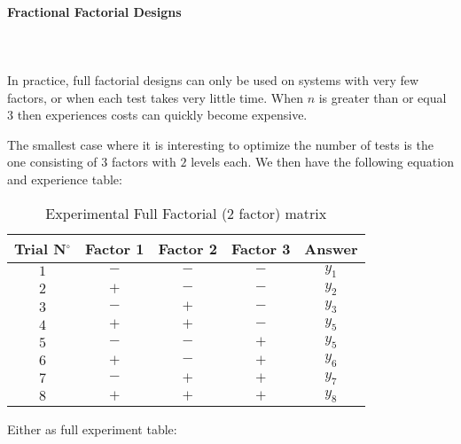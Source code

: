 	\pagebreak
	\paragraph{Fractional Factorial Designs}\mbox{}\\\\
	In practice, full factorial designs can only be used on systems with very few factors, or when each test takes very little time. When $n$ is greater than or equal $3$ then experiences costs can quickly become expensive.

	The smallest case where it is interesting to optimize the number of tests is the one consisting of $3$ factors with $2$ levels each. We then have the following equation and experience table:
	
	\begin{table}[H]\centering
	\begin{center}
			\begin{tabular}{|c|c|c|c|c|}
				\hline
				\multicolumn{1}{c}{\cellcolor{black!30}\textbf{Trial N${}^\circ$}} & 
  \multicolumn{1}{c}{\cellcolor{black!30}\textbf{Factor 1}} & 
  \multicolumn{1}{c}{\cellcolor{black!30}\textbf{Factor 2}} & 
  \multicolumn{1}{c}{\cellcolor{black!30}\textbf{Factor 3}} & 
  \multicolumn{1}{c}{\cellcolor{black!30}\textbf{Answer}} \\ \hline
				 $1$ & $-$ & $-$ & $-$ & $y_1$\\ \hline
				 $2$ & $+$ & $-$ & $-$ & $y_2$\\ \hline
				 $3$ & $-$ & $+$ & $-$ & $y_3$\\ \hline
				 $4$ & $+$ & $+$ & $-$ & $y_5$\\ \hline
	 			 $5$ & $-$ & $-$ & $+$ & $y_5$\\ \hline
  				 $6$ & $+$ & $-$ & $+$ & $y_6$\\ \hline
  				 $7$ & $-$ & $+$ & $+$ & $y_7$\\ \hline
  				 $8$ & $+$ & $+$ & $+$ & $y_8$\\ \hline
 		\end{tabular}
	\end{center}
	\caption{Experimental Full Factorial (2 factor) matrix}
	\end{table}
	Either as full experiment table:
